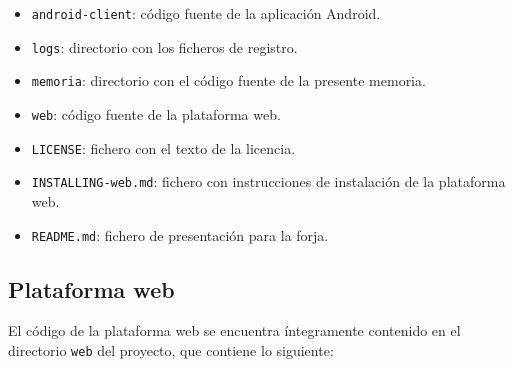 \begin{itemize}
\item \texttt{android-client}: código fuente de la aplicación Android.
\item \texttt{logs}: directorio con los ficheros de registro.
\item \texttt{memoria}: directorio con el código fuente de la presente memoria.
\item \texttt{web}: código fuente de la plataforma web.
\item \texttt{LICENSE}: fichero con el texto de la licencia.
\item \texttt{INSTALLING-web.md}: fichero con instrucciones de instalación de la plataforma web.
\item \texttt{README.md}: fichero de presentación para la forja.
\end{itemize}

\subsection{Plataforma web}

El código de la plataforma web se encuentra íntegramente contenido en el
directorio \texttt{web} del proyecto, que contiene lo siguiente:

